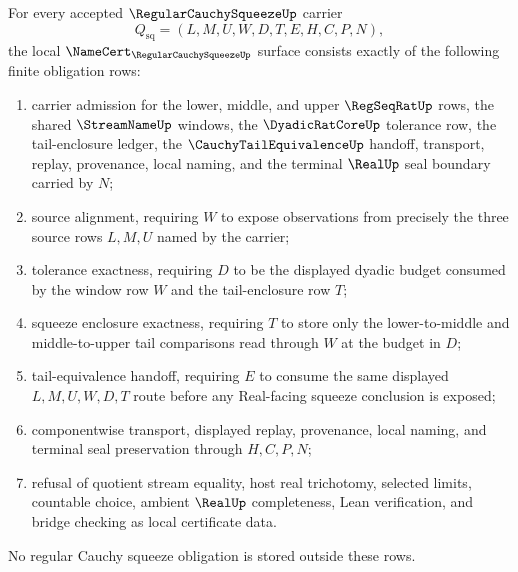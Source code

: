 \begin{theorem}
\label{thm:regular-cauchy-squeeze-namecert-obligations}
For every accepted $\RegularCauchySqueezeUp$ carrier
$$
Q_{\mathrm{sq}}=(L,M,U,W,D,T,E,H,C,P,N),
$$
the local $\NameCert_{\RegularCauchySqueezeUp}$ surface consists exactly of the following finite obligation rows:
\begin{enumerate}
\item carrier admission for the lower, middle, and upper $\RegSeqRatUp$ rows, the shared $\StreamNameUp$ windows, the $\DyadicRatCoreUp$ tolerance row, the tail-enclosure ledger, the $\CauchyTailEquivalenceUp$ handoff, transport, replay, provenance, local naming, and the terminal $\RealUp$ seal boundary carried by $N$;
\item source alignment, requiring $W$ to expose observations from precisely the three source rows $L,M,U$ named by the carrier;
\item tolerance exactness, requiring $D$ to be the displayed dyadic budget consumed by the window row $W$ and the tail-enclosure row $T$;
\item squeeze enclosure exactness, requiring $T$ to store only the lower-to-middle and middle-to-upper tail comparisons read through $W$ at the budget in $D$;
\item tail-equivalence handoff, requiring $E$ to consume the same displayed $L,M,U,W,D,T$ route before any Real-facing squeeze conclusion is exposed;
\item componentwise transport, displayed replay, provenance, local naming, and terminal seal preservation through $H,C,P,N$;
\item refusal of quotient stream equality, host real trichotomy, selected limits, countable choice, ambient $\RealUp$ completeness, Lean verification, and bridge checking as local certificate data.
\end{enumerate}
No regular Cauchy squeeze obligation is stored outside these rows.
\end{theorem}
